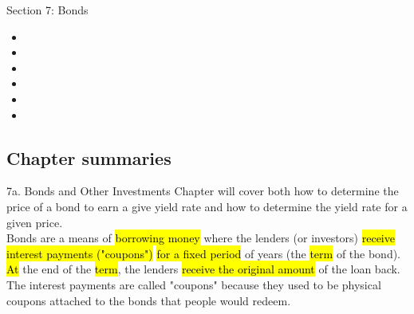 \begin{ASM_chapter}
Section 7: Bonds
\begin{itemize}
	\item	{}
	\item	{}
	\item	{}
	\item	{}
	\item	{}
	\item	{}
\end{itemize}
\end{ASM_chapter}

\subsection{Chapter summaries}

\begin{CHPT_SUMM_AUTO}[label = {L.-7a}]{7a. Bonds and Other Investments}
Chapter will cover both how to determine the price of a bond to earn a give yield rate and how to determine the yield rate for a given price.\\

Bonds are a means of \hl{borrowing money} where the lenders (or investors) \hl{receive interest payments ("coupons")} \hl{for a fixed period} of years (the \hl{term} of the bond). \hl{At} the end of the \hl{term}, the lenders \hl{receive the original amount} of the loan back.\\

The interest payments are called "coupons" because they used to be physical coupons attached to the bonds that people would redeem.
\end{CHPT_SUMM_AUTO}

